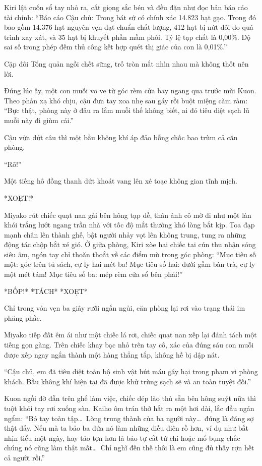 \documentclass[../main.tex]{subfiles}
\begin{document}
Kiri lật cuốn sổ tay nhỏ ra, cất giọng sắc bén và đều đặn như đọc bản báo cáo tài chính: ``Báo cáo Cậu chủ: Trong bát sứ có chính xác 14.823 hạt gạo. Trong đó bao gồm 14.376 hạt nguyên vẹn đạt chuẩn chất lượng, 412 hạt bị nứt đôi do quá trình xay xát, và 35 hạt bị khuyết phần mầm phôi. Tỷ lệ tạp chất là 0,00\%. Độ sai số trong phép đếm thủ công kết hợp quét thị giác của con là 0,01\%.''

Cặp đôi Tổng quản ngồi chết sững, trố tròn mắt nhìn nhau mà không thốt nên lời.

Đúng lúc ấy, một con muỗi vo ve từ góc rèm cửa bay ngang qua trước mũi Kuon. Theo phản xạ khó chịu, cậu đưa tay xoa nhẹ sau gáy rồi buột miệng càm ràm: ``Bực thật, phòng này ở đâu ra lắm muỗi thế không biết, ai đó tiêu diệt sạch lũ muỗi này đi giùm cái.''

Cậu vừa dứt câu thì một bầu không khí áp đảo bỗng chốc bao trùm cả căn phòng.

``Rõ!''

Một tiếng hô đồng thanh dứt khoát vang lên xé toạc không gian tĩnh mịch.

*XOẸT!*

Miyako rút chiếc quạt nan gài bên hông tạp dề, thân ảnh cô mờ đi như một làn khói trắng lướt ngang trần nhà với tốc độ mắt thường khó lòng bắt kịp. Toa đạp mạnh chân lên thành ghế, bật người nhảy vọt lên không trung, tung ra những động tác chộp bắt xé gió. Ở giữa phòng, Kiri xòe hai chiếc tai cún thu nhận sóng siêu âm, ngón tay chỉ thoăn thoắt về các điểm mù trong góc phòng: ``Mục tiêu số một: góc trên tủ sách, cự ly hai mét ba! Mục tiêu số hai: dưới gầm bàn trà, cự ly một mét tám! Mục tiêu số ba: mép rèm cửa sổ bên phải!''

*BỐP!* *TÁCH* *XOẸT*

Chỉ trong vỏn vẹn ba giây rưỡi ngắn ngủi, căn phòng lại rơi vào trạng thái im phăng phắc.

Miyako tiếp đất êm ái như một chiếc lá rơi, chiếc quạt nan xếp lại đánh tách một tiếng gọn gàng. Trên chiếc khay bạc nhỏ trên tay cô, xác của đúng sáu con muỗi được xếp ngay ngắn thành một hàng thẳng tắp, không hề bị dập nát.

``Cậu chủ, em đã tiêu diệt toàn bộ sinh vật hút máu gây hại trong phạm vi phòng khách. Bầu không khí hiện tại đã được khử trùng sạch sẽ và an toàn tuyệt đối.''

Kuon ngồi đờ đẫn trên ghế làm việc, chiếc dép lào thủ sẵn bên hông suýt nữa thì tuột khỏi tay rơi xuống sàn. Kaiho ôm trán thở hắt ra một hơi dài, lắc đầu ngán ngẩm: ``Bó tay toàn tập\dots\ Lòng trung thành của ba người này\dots\ đúng là đáng sợ thật đấy. Nếu mà ta bảo ba đứa nó làm những điều điên rồ hơn, ví dụ như bắt nhịn tiểu một ngày, hay táo tợn hơn là bảo tự cắt tứ chi hoặc mổ bụng chắc chúng nó cũng làm thật mất\dots\ Chỉ nghĩ đến thế thôi là em cũng đủ thấy rợn hết cả người rồi.''
\end{document}
